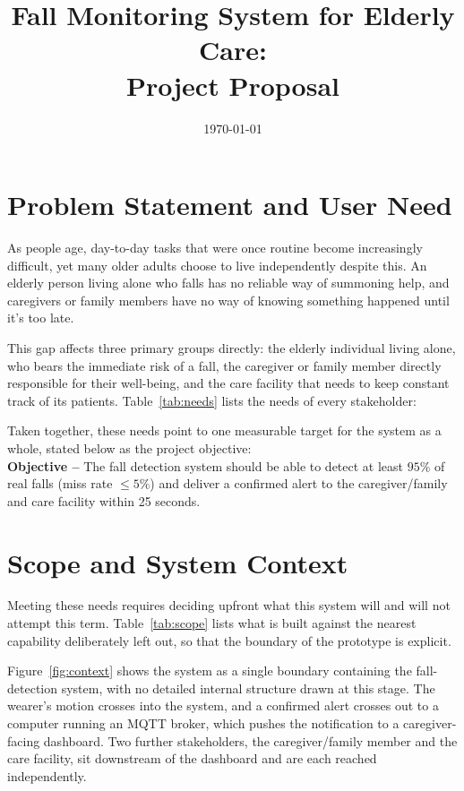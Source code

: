 \documentclass[conference,onecolumn]{IEEEtran}
\title{Fall Monitoring System for Elderly Care:\\ Project Proposal}
\author{
    \IEEEauthorblockN{Gianluca D'Altorio}
    \IEEEauthorblockA{Department of Computer Engineering Technology\\
    Vanier College}
}\date{\today}
\begin{document}
\maketitle

\section{Problem Statement and User Need}
\label{sec:problem}

As people age, day-to-day tasks that were once routine become increasingly difficult, yet many older adults choose to live independently despite this. An elderly person living alone who falls has no reliable way of summoning help, and caregivers or family members have no way of knowing something happened until it's too late.

This gap affects three primary groups directly: the elderly individual living alone, who bears the immediate risk of a fall, the caregiver or family member directly responsible for their well-being, and the care facility that needs to keep constant track of its patients. Table~\ref{tab:needs} lists the needs of every stakeholder:



Taken together, these needs point to one measurable target for the system as a whole, stated below as the project objective:\\

\textbf{Objective --} The fall detection system should be able to detect at least $95\%$ of real falls (miss rate $\leq 5\%$) and deliver a confirmed alert to the caregiver/family and care facility within 25 seconds.

\section{Scope and System Context}
\label{sec:scope}

Meeting these needs requires deciding upfront what this system will and will not attempt this term. Table~\ref{tab:scope} lists what is built against the nearest capability deliberately left out, so that the boundary of the prototype is explicit.



Figure~\ref{fig:context} shows the system as a single boundary containing the fall-detection system, with no detailed internal structure drawn at this stage. The wearer's motion crosses into the system, and a confirmed alert crosses out to a computer running an MQTT broker, which pushes the notification to a caregiver-facing dashboard. Two further stakeholders, the caregiver/family member and the care facility, sit downstream of the dashboard and are each reached independently.
\end{document}
